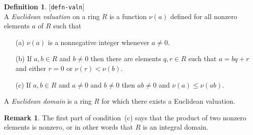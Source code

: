 \documentclass{amsart}
\newcommand{\lbl}[1]{\label{#1}\textup{[\texttt{#1}]}\ \\}
\newcommand{\lbl}{\label}
\renewcommand{\:}{\colon}
\theoremstyle{definition}
\newtheorem{remark}[theorem]{Remark}
\newtheorem{definition}[theorem]{Definition}
\begin{document}
\begin{definition}\lbl{defn-valn}
 A \emph{Euclidean valuation} on a ring $R$ is a function $\nu(a)$
 defined for all nonzero elements $a$ of $R$ such that
 \begin{itemize}
 \item[(a)] $\nu(a)$ is a nonnegative integer whenever $a\neq 0$.
 \item[(b)] If $a,b\in R$ and $b\neq 0$ then there are elements
  $q,r\in R$ such that $a=bq+r$ and either $r=0$ or $\nu(r)<\nu(b)$.
 \item[(c)] If $a,b\in R$ and $a\neq 0$ and $b\neq 0$ then $ab\neq 0$
  and $\nu(a)\leq\nu(ab)$.  
 \end{itemize}
 A \emph{Euclidean domain} is a ring $R$ for which there exists a
 Euclidean valuation.
\end{definition}
\begin{remark}
 The first part of condition~(c) says that the product of two nonzero
 elements is nonzero, or in other words that $R$ is an integral
 domain.
\end{remark}
\end{document}
